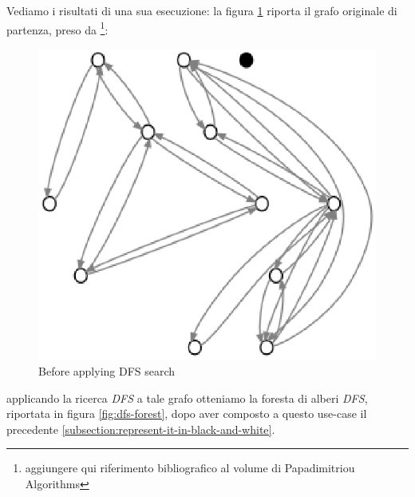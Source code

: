 Vediamo i risultati di una sua esecuzione: la figura
\ref{fig:before-applying-dfs-search} riporta il grafo originale di
partenza, preso da \footnote{aggiungere qui riferimento bibliografico
  al volume di Papadimitriou Algorithms}:
\begin{figure}
  \centering
  \includegraphics{images/OnePipingLevelUnitTest_Printer_DFS_PrinterPipe_Papadimitriou-phase-PrinterPipeFilter-level-0.eps}
  \caption{Before applying DFS search}
  \label{fig:before-applying-dfs-search}
\end{figure}
applicando la ricerca \emph{DFS} a tale grafo otteniamo la foresta di
alberi \emph{DFS}, riportata in figura \ref{fig:dfs-forest}, dopo aver
composto a questo use-case il precedente
\ref{subsection:represent-it-in-black-and-white}.
